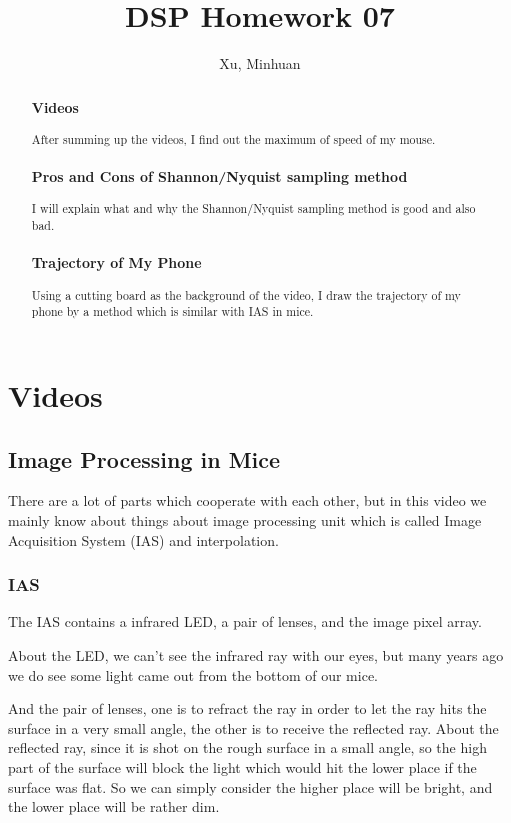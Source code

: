 \documentclass{article}
\begin{document}
\title{DSP Homework 07}
\author{Xu, Minhuan}
\maketitle
\tableofcontents
\begin{abstract}
\subsubsection*{Videos}
After summing up the videos, I find out the maximum of speed of my mouse.
\subsubsection*{Pros and Cons of Shannon/Nyquist sampling method}
I will explain what and why the Shannon/Nyquist sampling method is good and also bad.
\subsubsection*{Trajectory of My Phone}
Using a cutting board as the background of the video, I draw the trajectory of my phone by a method which is similar with IAS in mice.
\end{abstract}

\section{Videos}
\subsection{Image Processing in Mice}
There are a lot of parts which cooperate with each other, but in this video we mainly know about things about image processing unit which is called Image Acquisition System (IAS) and interpolation.

\subsubsection{IAS}

The IAS contains a infrared LED, a pair of lenses, and the image pixel array. 

About the LED, we can't see the infrared ray with our eyes, but many years ago we do see some light came out from the bottom of our mice.

And the pair of lenses, one is to refract the ray in order to let the ray hits the surface in a very small angle, the other is to receive the reflected ray. About the reflected ray, since it is shot on the rough surface in a small angle, so the high part of the surface will block the light which would hit the lower place if the surface was flat. So we can simply consider the higher place will be bright, and the lower place will be rather dim.
\end{document}
